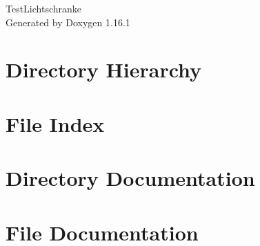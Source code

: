 \documentclass[twoside]{book}
\newcommand{\+}{\discretionary{\mbox{\scriptsize$\hookleftarrow$}}{}{}}
\newcommand{\clearemptydoublepage}{%
    \newpage{\pagestyle{empty}\cleardoublepage}%
  }
\begin{document}
  \raggedbottom
  \begin{titlepage}
  \vspace*{7cm}
  \begin{center}%
  {\Large Test\+Lichtschranke}\\
  \vspace*{1cm}
  {\large Generated by Doxygen 1.16.1}\\
  \end{center}
  \end{titlepage}
  \clearemptydoublepage
  \tableofcontents
  \clearemptydoublepage
\chapter{Directory Hierarchy}

\chapter{File Index}

\chapter{Directory Documentation}






\chapter{File Documentation}


  \backmatter
  \newpage
  \clearemptydoublepage
  \printindex
\end{document}
